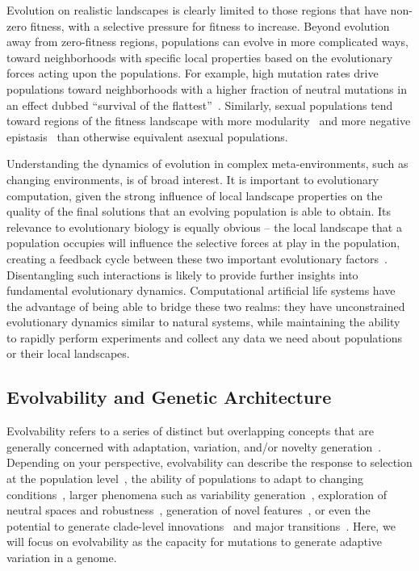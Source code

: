 \documentclass[10pt,letterpaper,final]{article}
\begin{document}
Evolution on realistic landscapes is clearly limited to those regions that have non-zero fitness, with a selective pressure for fitness to increase. 
Beyond evolution away from zero-fitness regions, populations can evolve in more complicated ways, toward neighborhoods with specific local properties based on the evolutionary forces acting upon the populations. For example, high mutation rates drive populations toward neighborhoods with a higher fraction of neutral mutations in an effect dubbed “survival of the flattest”~\cite{wilke_evolution_2001}. Similarly, sexual populations tend toward regions of the fitness landscape with more modularity~\cite{misevic_sexual_2006} and more negative epistasis~\cite{misevic_experiments_2010} than otherwise equivalent asexual populations.

Understanding the dynamics of evolution in complex meta-environments, such as changing environments, is of broad interest. It is important to evolutionary computation, given the strong influence of local landscape properties on the quality of the final solutions that an evolving population is able to obtain. Its relevance to evolutionary biology is equally obvious -- the local landscape that a population occupies will influence the selective forces at play in the population, creating a feedback cycle between these two important evolutionary factors~\cite{zaman_coevolution_2014,meyer_repeatability_2012,martin_fitness_2006,kvitek_reciprocal_2011}. Disentangling such interactions is likely to provide further insights into fundamental evolutionary dynamics. Computational artificial life systems have the advantage of being able to bridge these two realms: they have unconstrained evolutionary dynamics similar to natural systems, while maintaining the ability to rapidly perform experiments and collect any data we need about populations or their local landscapes.


\subsection*{Evolvability and Genetic Architecture}
Evolvability refers to a series of distinct but overlapping concepts that are generally concerned with adaptation, variation, and/or novelty generation~\cite{pigliucci_is_2008}. Depending on your perspective, evolvability can describe the response to selection at the population level~\cite{fisher_genetical_1930,houle_comparing_1992}, the ability of populations to adapt to changing conditions~\cite{belle_code_2002}, larger phenomena such as variability generation~\cite{gunter_p._wagner_perspective:_1996}, 
exploration of neutral spaces and robustness~\cite{andreas_wagner_robustness_2005,kitano_biological_2004}, 
generation of novel features~\cite{alberch_genes_1991,brookfield_evolution:_2001}, 
or even the potential to generate clade-level innovations~\cite{kirschner_evolvability_1998} 
and major transitions~\cite{smith_major_1995}. Here, we will focus on evolvability as the capacity for mutations to generate adaptive variation in a genome. 
\end{document}
